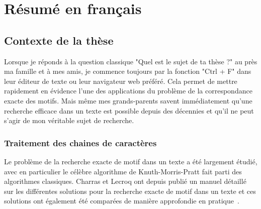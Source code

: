 \chapter*{Résumé en français}\setcounter{page}{1}



\newpage

\section*{Contexte de la thèse}

Lorsque je réponds à la question classique "Quel est le sujet de ta thèse ?" au près ma famille et à mes amis, je commence toujours par la fonction "Ctrl + F" dans leur éditeur de texte ou leur navigateur web préféré. Cela permet de mettre rapidement en évidence l'une des applications du problème de la correspondance exacte des motifs.
Mais même mes grands-parents savent immédiatement qu'une recherche efficace dans un texte est possible depuis des décennies et qu'il ne peut s'agir de mon véritable sujet de recherche.

\subsection*{Traitement des chaines de caractères}

Le problème de la recherche exacte de motif dans un texte a été largement étudié, avec en particulier le célèbre algorithme de Knuth-Morris-Pratt fait parti des algorithmes classiques. Charras et Lecroq ont depuis publié un manuel détaillé~\cite{charras2004handbook} sur les différentes solutions pour la recherche exacte de motif dans un texte et ces solutions ont également été comparées de manière approfondie en pratique~\cite{DBLP:journals/corr/abs-1012-2547, faro2013exact}.


